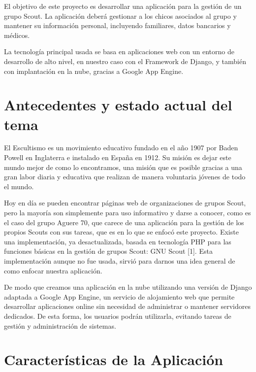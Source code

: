 El objetivo de este proyecto es desarrollar una aplicación para la gestión de un grupo
 Scout. La aplicación deberá gestionar a los chicos asociados al grupo y mantener su 
información personal, incluyendo familiares, datos bancarios y médicos. 

La tecnología principal usada se basa en aplicaciones web con un entorno de desarrollo de alto
nivel, en nuestro caso con el Framework de Django, y también con implantación en la nube, gracias a 
Google App Engine.
\section{Antecedentes y estado actual del tema}
\label{1:sec:1}
El Escultismo es un movimiento educativo fundado en el año 1907 por Baden Powell en Inglaterra
e instalado en España en 1912. Su misión es dejar este mundo mejor de como lo encontramos,
una misión que es posible gracias a una gran labor diaria y educativa que realizan de manera
voluntaria jóvenes de todo el mundo.

Hoy en día se pueden encontrar páginas web de organizaciones de grupos Scout,  pero la mayoría
son simplemente para uso informativo y darse a conocer, como es el caso del grupo Aguere 70, que carece de
una aplicación para la gestión de los propios Scouts con sus tareas, que es en lo que se enfocó este proyecto. Existe
una implementación, ya desactualizada, basada en tecnología PHP para las funciones básicas en la gestión de grupos
Scout: GNU Scout [1]. Esta implementación aunque no fue usada, sirvió para darnos una idea general
de como enfocar nuestra aplicación.

De modo que creamos una aplicación en la nube utilizando una versión de Django adaptada a Google 
App Engine, un servicio de alojamiento web que permite desarrollar aplicaciones online sin 
necesidad de administrar o mantener servidores dedicados. De esta forma, los usuarios podrán utilizarla, evitando 
tareas de gestión y administración de sistemas.


\section{Características de la Aplicación}
\label{1:sec:2}

